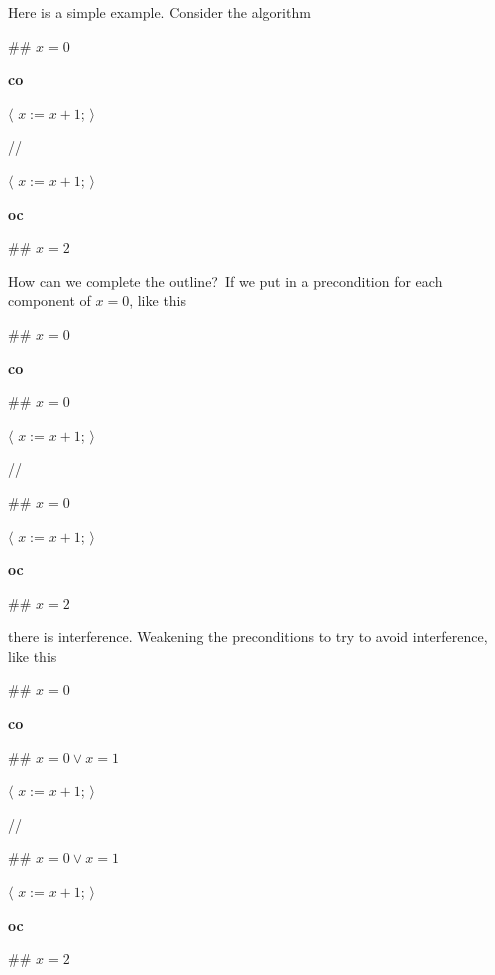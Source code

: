 \documentclass[muchmore,11pt]{article}%
\begin{document}
Here is a simple example. Consider the algorithm

\begin{code}
\#\# $x=0$

\textbf{co}

\begin{indent}
\item $\langle$ $x:=x+1$; $\rangle$
\end{indent}

//

\begin{indent}
\item $\langle$ $x:=x+1$; $\rangle$
\end{indent}

\textbf{oc}

\#\# $x=2$
\end{code}

How can we complete the outline?\ If we put in a precondition for each
component of $x=0$, like this

\begin{code}
\#\# $x=0$

\textbf{co}

\begin{indent}
\item \#\# $x=0$

\item $\langle$ $x:=x+1$; $\rangle$
\end{indent}

//

\begin{indent}
\item \#\# $x=0$

\item $\langle$ $x:=x+1$; $\rangle$
\end{indent}

\textbf{oc}

\#\# $x=2$
\end{code}

\noindent there is interference. Weakening the preconditions to try to avoid
interference, like this

\begin{code}
\#\# $x=0$

\textbf{co}

\begin{indent}
\item \#\# $x=0\vee x=1$

\item $\langle$ $x:=x+1$; $\rangle$
\end{indent}

//

\begin{indent}
\item \#\# $x=0\vee x=1$

\item $\langle$ $x:=x+1$; $\rangle$
\end{indent}

\textbf{oc}

\#\# $x=2$
\end{code}
\end{document}

